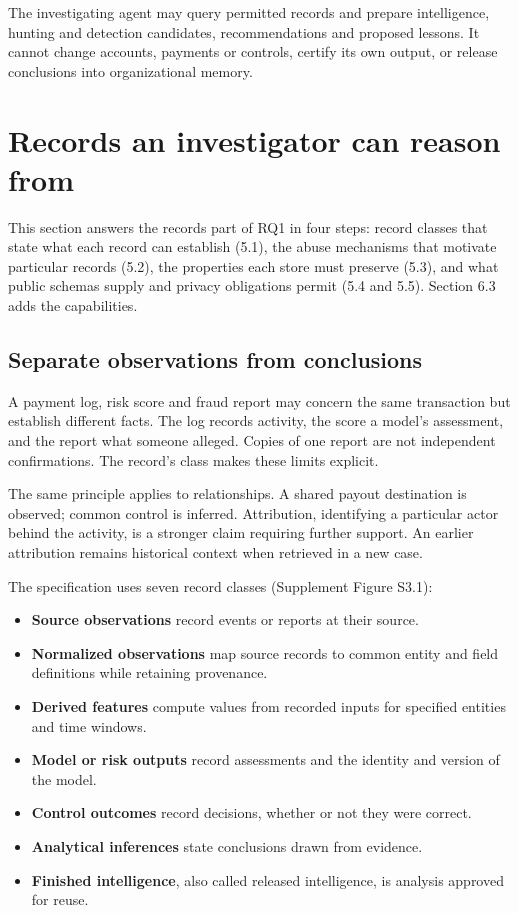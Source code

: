 \documentclass[acmlarge,nonacm]{acmart}
\providecommand{\tightlist}{\setlength{\itemsep}{0pt}\setlength{\parskip}{0pt}}
\begin{document}
The investigating agent may query permitted records and prepare
intelligence, hunting and detection candidates, recommendations and
proposed lessons. It cannot change accounts, payments or controls,
certify its own output, or release conclusions into organizational
memory.

\hypertarget{records-an-investigator-can-reason-from}{%
\section{Records an investigator can reason
from}\label{records-an-investigator-can-reason-from}}

This section answers the records part of RQ1 in four steps: record
classes that state what each record can establish (5.1), the abuse
mechanisms that motivate particular records (5.2), the properties each
store must preserve (5.3), and what public schemas supply and privacy
obligations permit (5.4 and 5.5). Section 6.3 adds the capabilities.

\hypertarget{separate-observations-from-conclusions}{%
\subsection{Separate observations from
conclusions}\label{separate-observations-from-conclusions}}

A payment log, risk score and fraud report may concern the same
transaction but establish different facts. The log records activity, the
score a model's assessment, and the report what someone alleged. Copies
of one report are not independent confirmations. The record's class
makes these limits explicit.

The same principle applies to relationships. A shared payout destination
is observed; common control is inferred. Attribution, identifying a
particular actor behind the activity, is a stronger claim requiring
further support. An earlier attribution remains historical context when
retrieved in a new case.

The specification uses seven record classes (Supplement Figure S3.1):

\begin{itemize}
\tightlist
\item
  \textbf{Source observations} record events or reports at their source.
\item
  \textbf{Normalized observations} map source records to common entity
  and field definitions while retaining provenance.
\item
  \textbf{Derived features} compute values from recorded inputs for
  specified entities and time windows.
\item
  \textbf{Model or risk outputs} record assessments and the identity and
  version of the model.
\item
  \textbf{Control outcomes} record decisions, whether or not they were
  correct.
\item
  \textbf{Analytical inferences} state conclusions drawn from evidence.
\item
  \textbf{Finished intelligence}, also called released intelligence, is
  analysis approved for reuse.
\end{itemize}
\end{document}
